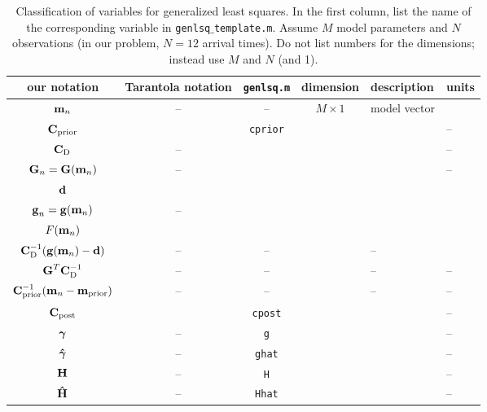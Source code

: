 \begin{table}[h]
\caption[]{{
Classification of variables for generalized least squares. In the first column, list the name of the corresponding variable in {\tt genlsq$\_$template.m}. Assume $M$ model parameters and $N$ observations (in our problem, $N=12$ arrival times). Do not list numbers for the dimensions; instead use $M$ and $N$ (and 1).
\label{tab:vars}
}}
\begin{spacing}{1.4}
\hspace{-1cm}
\begin{tabular}{c|c|c|c|l|l}
\hline
our notation & Tarantola notation & {\tt genlsq.m} & dimension & description \hspace{2cm} & units \hspace{0.5cm} \\
\hline\hline 
$\mbox{${\bf m}$}_n$
& --
& --
& $M \times 1$ 
& model vector
&
\\ \hline
$\mbox{${\bf C}$}_{\rm prior}$
& 
& \verb+cprior+
&
&
& --
\\ \hline
$\mbox{${\bf C}$}_{\rm D}$
& --
&
&
&
& --
\\ \hline
$\mbox{${\bf G}$}_n = \mbox{${\bf G}$}(\mbox{${\bf m}$}_n)$
& --
& 
&
&
& --
\\ \hline
$\mbox{${\bf d}$}$
&
&
&
& 
\\ \hline
$\mbox{${\bf g}$}_n = \mbox{${\bf g}$}(\mbox{${\bf m}$}_n)$
& --
&
&
& 
\\ \hline
\hline
$F(\mbox{${\bf m}$}_n)$
&
&
&
&
\\ \hline
$\mbox{${\bf C}$}_{\rm D}^{-1} (\mbox{${\bf g}$}(\mbox{${\bf m}$}_n) - \mbox{${\bf d}$})$
& --
& --
&
& --
\\ \hline
$\mbox{${\bf G}$}^T\mbox{${\bf C}$}_{\rm D}^{-1}$
& --
& --
&
& --
& --
\\ \hline
$\mbox{${\bf C}$}_{\rm prior}^{-1} (\mbox{${\bf m}$}_n - \mbox{${\bf m}$}_{\rm prior})$
& --
& --
&
& --
& --
\\ \hline
\hline
$\mbox{${\bf C}$}_{\rm post}$
& 
& \verb+cpost+
&
& 
& --
\\ \hline
$\mbox{\boldmath $\bf \gamma$}$
& --
& \verb+g+
&
&
& --
\\ \hline
$\mbox{\boldmath{$\hat{\gamma}$}}$
& --
& \verb+ghat+
&
&
& --
\\ \hline
$\mbox{${\bf H}$}$
& --
& \verb+H+
&
&
& --
\\ \hline
$\mbox{\boldmath{$\hat{\rm H}$}}$
& --
& \verb+Hhat+
&
&
& --
\\ \hline
\hline
\end{tabular}
\end{spacing}
\end{table}
